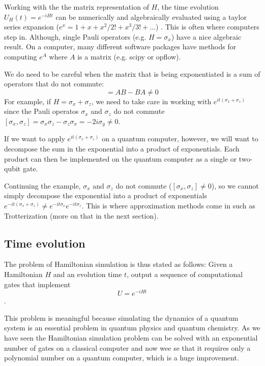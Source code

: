 Working with the the matrix representation of $H$, the time evolution $U_H(t) = e^{-iHt}$ can be numerically and algebraically evaluated using a taylor series expansion ($e^x = 1 + x + x^2/2! + x^3/3! + ... $) . This is often where computers step in. Although, single Pauli operators (e.g. $H=\sigma_x$) have a nice algebraic result. On a computer, many different software packages have methods for computing $e^A$ where $A$ is a matrix (e.g. scipy or opflow).

We do need to be careful when the matrix that is being exponentiated is a sum of operators that do not commute\cite{Shankar}:
\begin{equation}
[A,B] = AB - BA \neq 0
\end{equation}
 For example, if $H = \sigma_x + \sigma_z$, we need to take care in working with $e^{it(\sigma_x + \sigma_z)}$ since the Pauli operatos $\sigma_x$ and $\sigma_z$ do not commute $[\sigma_x, \sigma_z] = \sigma_x \sigma_z - \sigma_z \sigma_x = -2i\sigma_y \neq0$.
 
 If we want to apply $e^{it(\sigma_x + \sigma_z)}$ on a quantum computer, however, we will want to decompose the sum in the exponential into a product of exponentials. Each product can then be implemented on the quantum computer as a single or two-qubit gate. 
 
 Continuing the example, $\sigma_x$ and $\sigma_z$ do not commute ($[\sigma_x, \sigma_z] \neq 0$), so we cannot simply decompose the exponential into a product of exponentials $e^{-it(\sigma_x + \sigma_z)} \neq e^{-it\sigma_x}e^{-it\sigma_z}$. This is where approximation methods come in such as Trotterization (more on that in the next section).

\subsection{Time evolution}


The problem of Hamiltonian simulation is thus stated as follows: Given a Hamiltonian 
$H$ and an evolution time  $t$, output a sequence of computational gates that implement
\begin{equation}\label{eq:u}
U = e^{-iHt}
\end{equation}.

This problem is meaningful because simulating the dynamics of a quantum system is an essential problem in quantum physics and quantum chemistry. As we have seen the Hamiltonian simulation problem can be solved with an exponential number of gates on a classical computer and now wee se that it requires only a polynomial number on a quantum computer, which is a huge improvement.

